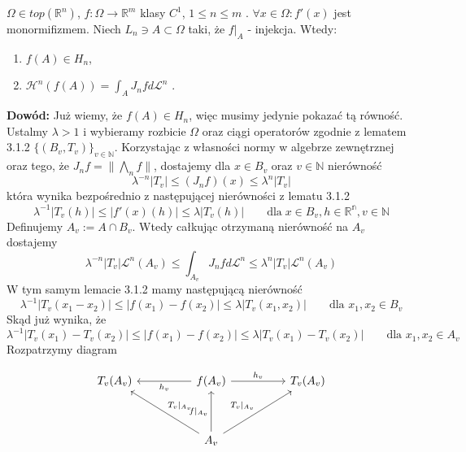 \begin{tw}
	$\Omega \in top(\mathbb{R}^n)$, $f: \Omega \rightarrow \mathbb{R}^m$ klasy $C^1$, $1 \leq n \leq m$ . $\forall x \in \Omega: f'(x)$ jest monormifizmem. Niech $L_n \ni A \subset \Omega$ taki, że $f|_A$ - injekcja. Wtedy:
	\begin{enumerate}	
		\item $f(A) \in H_n$,
		\item $\mathcal{H}^n(f(A)) = \int_A J_nfd \mathcal{L}^n$ .
	\end{enumerate}
	
	\textbf{Dowód:}\newline
	Już wiemy, że $f(A) \in H_n$, więc musimy jedynie pokazać tą równość. Ustalmy $\lambda > 1$ i wybieramy rozbicie $\Omega$ oraz ciągi operatorów zgodnie z lematem 3.1.2 $\{(B_v, T_v)\}_{v \in \mathbb{N}}$. Korzystając z własności normy w algebrze zewnętrznej oraz tego, że $J_nf = \|\bigwedge_nf\|$, dostajemy dla $x \in B_v$ oraz $v \in \mathbb{N}$ nierówność 
	$$
		\lambda^{-n}|T_v| \leq (J_nf)(x) \leq \lambda^n|T_v|
	$$
	która wynika bezpośrednio z następującej nierówności z lematu 3.1.2 
	$$
		\lambda^{-1}|T_v(h)| \leq |f'(x)(h)| \leq \lambda|T_v(h)| \quad\quad  \text{dla} \; x \in B_v, h \in \mathbb{R^n}, v \in \mathbb{N}
	$$
	Definujemy $A_v := A \cap B_v$. Wtedy całkując otrzymaną nierówność na $A_v$ dostajemy $$
		\lambda^{-n}|T_v|\mathcal{L}^n(A_v) \leq \int_{A_v}J_nf d \mathcal{L}^n \leq \lambda^n |T_v| \mathcal{L}^n(A_v)
	$$
	W tym samym lemacie 3.1.2 mamy następującą nierówność $$
		\lambda^{-1}|T_v(x_1 - x_2)| \leq |f(x_1) - f(x_2)| \leq \lambda |T_v(x_1, x_2)| \quad \quad \text{dla } x_1,x_2 \in B_v  
	$$
	Skąd już wynika, że $$
		\lambda^{-1}|T_v(x_1) - T_v(x_2)| \leq |f(x_1) - f(x_2)| \leq \lambda|T_v(x_1) - T_v(x_2)| \quad \quad \text{dla } x_1, x_2 \in A_v
	$$
	Rozpatrzymy diagram

	$$
	\begin{tikzcd}
		T_v(A_v) &    & f(A_v) \arrow[ll, "h_v"] \arrow[rr, "h_v"]                                               &  & T_v(A_v) \\
				&     &                                                                                   &  &          \\
				&     & A_v \arrow[lluu, "T_v|_{A_v}"'] \arrow[rruu, "T_v|_{A_v}"] \arrow[uu, "f|_{A_v}"] &  &         
	\end{tikzcd}
	$$




\end{tw}
